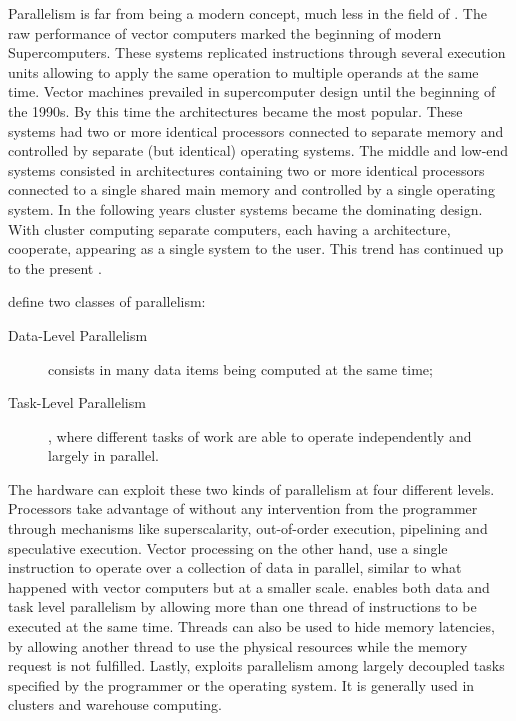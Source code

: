 \documentclass[../thesis]{subfiles}
\begin{document}
	Parallelism is far from being a modern concept, much less in the field of \hpc. The raw performance of vector computers marked the beginning of modern Supercomputers\cite{Strohmaier:2005:20years}. These systems replicated instructions through several execution units allowing to apply the same operation to multiple operands at the same time. Vector machines prevailed in supercomputer design until the beginning of the 1990s. By this time the \mpp architectures became the most popular. These systems had two or more identical processors connected to separate memory and controlled by separate (but identical) operating systems. The middle and low-end systems consisted in \smp architectures containing two or more identical processors connected to a single shared main memory and controlled by a single operating system. In the following years cluster systems became the dominating design. With cluster computing separate computers, each having a \smp architecture, cooperate, appearing as a single system to the user. This trend has continued up to the present \cite{TheNextWave:1:2013:Supercomputers,TOP500:overtime}.

	 define two classes of parallelism:
		\begin{description}
			\item [Data-Level Parallelism] consists in many data items being computed at the same time;
			\item [Task-Level Parallelism], where different tasks of work are able to operate independently and largely in parallel.
		\end{description}
	The hardware can exploit these two kinds of parallelism at four different levels. Processors take advantage of \ilp without any intervention from the programmer through mechanisms like superscalarity, out-of-order execution, pipelining and speculative execution. Vector processing on the other hand, use a single instruction to operate over a collection of data in parallel, similar to what happened with vector computers but at a smaller scale. \tlp enables both data and task level parallelism by allowing more than one thread of instructions to be executed at the same time. Threads can also be used to hide memory latencies, by allowing another thread to use the physical resources while the memory request is not fulfilled. Lastly, \rlp exploits parallelism among largely decoupled tasks specified by the programmer or the operating system. It is generally used in clusters and warehouse computing.
\end{document}
